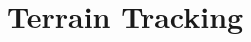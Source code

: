 \chapter{Terrain Tracking}
\label{chap:fifth}
\ifpdf
    \graphicspath{{Chapter5/Figures/PNG/}{Chapter5/Figures/PDF/}{Chapter5/Figures/}{Chapter5/Figures/EPS/}}
\else
    \graphicspath{{Chapter5/Figures/EPS/}{Chapter5/Figures/}}
\fi